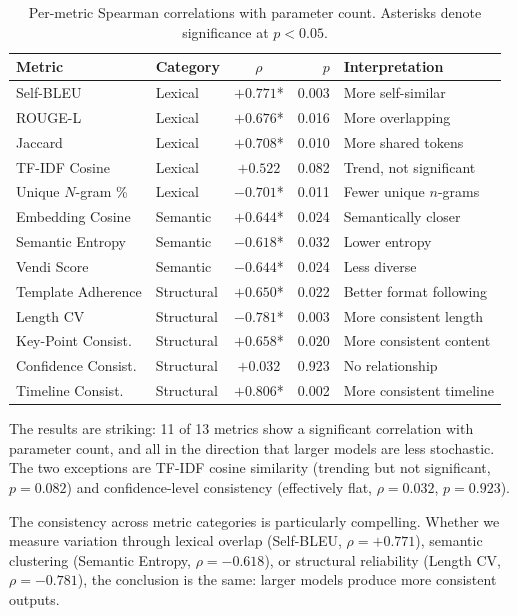 \documentclass[11pt,a4paper]{article}
\begin{document}
\begin{table}[t]
\centering
\caption{Per-metric Spearman correlations with parameter count. Asterisks denote significance at $p < 0.05$.}
\label{tab:correlations}
\small
\begin{tabular}{@{}llcrl@{}}
\toprule
\textbf{Metric} & \textbf{Category} & \textbf{$\rho$} & \textbf{$p$} & \textbf{Interpretation} \\
\midrule
Self-BLEU            & Lexical    & $+0.771$* & 0.003 & More self-similar \\
ROUGE-L              & Lexical    & $+0.676$* & 0.016 & More overlapping \\
Jaccard              & Lexical    & $+0.708$* & 0.010 & More shared tokens \\
TF-IDF Cosine        & Lexical    & $+0.522$  & 0.082 & Trend, not significant \\
Unique $N$-gram \%   & Lexical    & $-0.701$* & 0.011 & Fewer unique $n$-grams \\
\midrule
Embedding Cosine     & Semantic   & $+0.644$* & 0.024 & Semantically closer \\
Semantic Entropy     & Semantic   & $-0.618$* & 0.032 & Lower entropy \\
Vendi Score          & Semantic   & $-0.644$* & 0.024 & Less diverse \\
\midrule
Template Adherence   & Structural & $+0.650$* & 0.022 & Better format following \\
Length CV            & Structural & $-0.781$* & 0.003 & More consistent length \\
Key-Point Consist.   & Structural & $+0.658$* & 0.020 & More consistent content \\
Confidence Consist.  & Structural & $+0.032$  & 0.923 & No relationship \\
Timeline Consist.    & Structural & $+0.806$* & 0.002 & More consistent timeline \\
\bottomrule
\end{tabular}
\end{table}

The results are striking: 11 of 13 metrics show a significant correlation with parameter count, and all in the direction that larger models are less stochastic.
The two exceptions are TF-IDF cosine similarity (trending but not significant, $p = 0.082$) and confidence-level consistency (effectively flat, $\rho = 0.032$, $p = 0.923$).

The consistency across metric categories is particularly compelling.
Whether we measure variation through lexical overlap (Self-BLEU, $\rho = +0.771$), semantic clustering (Semantic Entropy, $\rho = -0.618$), or structural reliability (Length CV, $\rho = -0.781$), the conclusion is the same: larger models produce more consistent outputs.
\end{document}
